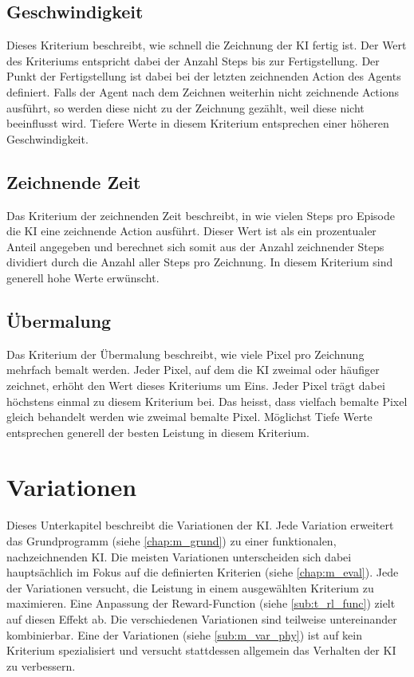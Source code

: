 \subsection{Geschwindigkeit}\label{sub:m_eval_speed} Dieses Kriterium
beschreibt, wie schnell die Zeichnung der KI fertig ist. Der Wert des Kriteriums
entspricht dabei der Anzahl Steps bis zur Fertigstellung. Der Punkt der
Fertigstellung ist dabei bei der letzten zeichnenden Action des Agents
definiert. Falls der Agent nach dem Zeichnen weiterhin nicht zeichnende Actions
ausführt, so werden diese nicht zu der Zeichnung gezählt, weil diese nicht
beeinflusst wird. Tiefere Werte in diesem Kriterium entsprechen einer höheren
Geschwindigkeit.

\subsection{Zeichnende Zeit}\label{sub:m_eval_zeichnend} Das Kriterium der
zeichnenden Zeit beschreibt, in wie vielen Steps pro Episode die KI eine
zeichnende Action ausführt. Dieser Wert ist als ein prozentualer Anteil
angegeben und berechnet sich somit aus der Anzahl zeichnender Steps dividiert
durch die Anzahl aller Steps pro Zeichnung. In diesem Kriterium sind generell
hohe Werte erwünscht.

\subsection{Übermalung}\label{sub:m_eval_uebermalung} Das Kriterium der
Übermalung beschreibt, wie viele Pixel pro Zeichnung mehrfach bemalt werden.
Jeder Pixel, auf dem die KI zweimal oder häufiger zeichnet, erhöht den Wert dieses
Kriteriums um Eins. Jeder Pixel trägt dabei höchstens einmal zu diesem Kriterium
bei. Das heisst, dass vielfach bemalte Pixel gleich behandelt werden wie zweimal
bemalte Pixel. Möglichst Tiefe Werte entsprechen generell der besten Leistung in
diesem Kriterium.


\section{Variationen}\label{chap:m_var} Dieses Unterkapitel beschreibt die
Variationen der KI. Jede Variation erweitert das Grundprogramm (siehe
\ref{chap:m_grund}) zu einer funktionalen, nachzeichnenden KI. Die meisten
Variationen unterscheiden sich dabei hauptsächlich im Fokus auf die definierten
Kriterien (siehe \ref{chap:m_eval}). Jede der Variationen versucht, die
Leistung in einem ausgewählten Kriterium zu maximieren. Eine Anpassung der
Reward-Function (siehe \ref{sub:t_rl_func}) zielt auf diesen Effekt ab.
Die verschiedenen Variationen sind teilweise untereinander kombinierbar. Eine
der Variationen (siehe \ref{sub:m_var_phy}) ist auf kein Kriterium
spezialisiert und versucht stattdessen allgemein das Verhalten der KI zu
verbessern.
 
